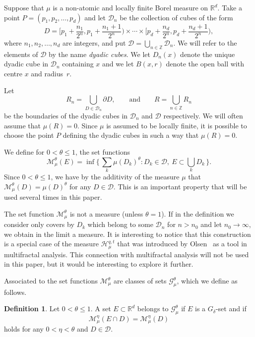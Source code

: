 \documentclass[11pt]{article}
\theoremstyle{definition}
\newtheorem{defi}[theo]{Definition}
\numberwithin{equation}{section}
\numberwithin{figure}{section}
\numberwithin{table}{section}
\begin{document}
Suppose that $\mu$ is a non-atomic and locally finite Borel measure on $\mathbb{R}^d$. Take a point $P = (p_1, p_2, \ldots, p_d)$ and let $\mathscr{D}_n$ be the collection of cubes of the form
\[
D = \biggl[p_1 + \frac{n_1}{2^n}, p_1 + \frac{n_1 + 1}{2^n} \biggr)
\times \cdots \times \biggl[p_d + \frac{n_d}{2^n}, p_d + \frac{n_d + 1}{2^n} \biggr),
\]
where $n_1, n_2, \ldots, n_d$ are integers, and put $\mathscr{D} =
\bigcup_{n \in \mathbb{Z}} \mathscr{D}_n$. We will refer to the elements of $\mathscr{D}$ by the name {\em dyadic cubes}. We let $D_n (x)$ denote the unique dyadic cube in $\mathscr{D}_n$ containing $x$ and we let $B(x,r)$ denote the open ball with centre $x$ and radius~$r$.

Let
\[
R_n = \bigcup_{D \in \mathscr{D}_n} \partial D, \qquad \text{and} \qquad R = \bigcup_{n \in \mathbb{Z}} R_n
\]
be the boundaries of the dyadic cubes in $\mathscr{D}_n$ and $\mathscr{D}$ respectively. We will often assume that $\mu (R) = 0$. Since $\mu$ is assumed to be locally finite, it is possible to choose the point $P$ defining the dyadic cubes in such a way that $\mu (R) = 0$.

We define for $0 < \theta \leq 1$, the set functions
\[
\mathscr{M}_\mu^\theta (E) = \inf \biggl\{\, \sum_k \mu (D_k)^\theta : D_k \in \mathscr{D},\ E \subset \bigcup_k D_k \,\biggr\}.
\]
Since $0 < \theta \leq 1$, we have by the additivity of the measure $\mu$ that $\mathscr{M}_\mu^\theta (D) = \mu (D)^\theta$ for any $D
\in \mathscr{D}$. This is an important property that will be used several times in this paper.

The set function $\mathscr{M}_\mu^\theta$ is not a measure (unless $\theta = 1$). If in the definition we consider only covers by $D_k$ which belong to some $\mathscr{D}_n$ for $n > n_0$ and let $n_0 \to \infty$, we obtain in the limit a measure. It is interesting to notice that this construction is a special case of the measure $\mathscr{H}_\mu^{q,t}$ that was introduced by Olsen~\cite{olsen} as a tool in multifractal analysis. This connection with multifractal analysis will not be used in this paper, but it would be interesting to explore it further.

Associated to the set functions $\mathscr{M}_\mu^\theta$ are classes of sets $\mathscr{G}_\mu^\theta$, which we define as follows.

\begin{defi}\label{def:class}
Let $0 < \theta \leq 1$. A set $E \subset \mathbb{R}^d$ belongs to $\mathscr{G}_\mu^\theta$ if $E$ is a $G_\delta$-set and if
\[
\mathscr{M}_\mu^\eta (E \cap D) = \mathscr{M}_\mu^\eta (D)
\]
holds for any $0 < \eta < \theta$ and $D \in \mathscr{D}$.
\end{defi}
\end{document}
